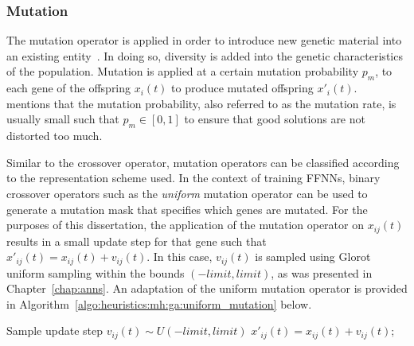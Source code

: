 \subsubsection{Mutation}\label{sec:heuristics:mh:ga:mutation}

The mutation operator is applied in order to introduce new genetic material into an existing entity~\cite{ref:engelbrecht:2007}. In doing so, diversity is added into the genetic characteristics of the population. Mutation is applied at a certain mutation probability $p_{m}$, to each gene of the offspring $x_{i}(t)$ to produce mutated offspring $x'_{i}(t)$.~\citeauthor{ref:engelbrecht:2007}~\cite{ref:engelbrecht:2007} mentions that the mutation probability, also referred to as the mutation rate, is usually small such that $p_{m} \in [0,1]$ to ensure that good solutions are not distorted too much.

Similar to the crossover operator, mutation operators can be classified according to the representation scheme used. In the context of training
\acp{FFNN}, binary crossover operators such as the \textit{uniform} mutation operator can be used to generate a mutation mask that specifies which genes are mutated. For the purposes of this dissertation, the application of the mutation operator on $x_{ij}(t)$ results in a small update step for that gene such that $x'_{ij}(t) = x_{ij}(t) + v_{ij}(t)$. In this case, $v_{ij}(t)$ is sampled using Glorot uniform sampling within the bounds $(-limit, limit)$, as was presented in Chapter~\ref{chap:anns}. An adaptation of the uniform mutation operator is provided in Algorithm~\ref{algo:heuristics:mh:ga:uniform_mutation} below.

\begin{algorithm}[H]
      \caption{The pseudo code for the uniform mutation operator as used by \acp{GA}.}
      \label{algo:heuristics:mh:ga:uniform_mutation}
      \begin{algorithmic}
            \State Sample update step $v_{ij}(t) \sim U(-limit, limit)$
            \State $x'_{ij}(t) = x_{ij}(t) + v_{ij}(t)$;
            \EndIf
            \EndFor
            \EndFor
            \State
      \end{algorithmic}
\end{algorithm}

